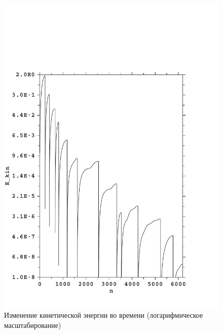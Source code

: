 \begin{figure}[h!]
\centering
  \includegraphics[width=1.0\textwidth]{./FIGs/Kin_energy_MD.pdf}
  \caption{Изменение кинетической энергии во времени (логарифмическое масштабирование)}
\label{kinet_energy_MD}
\end{figure}

